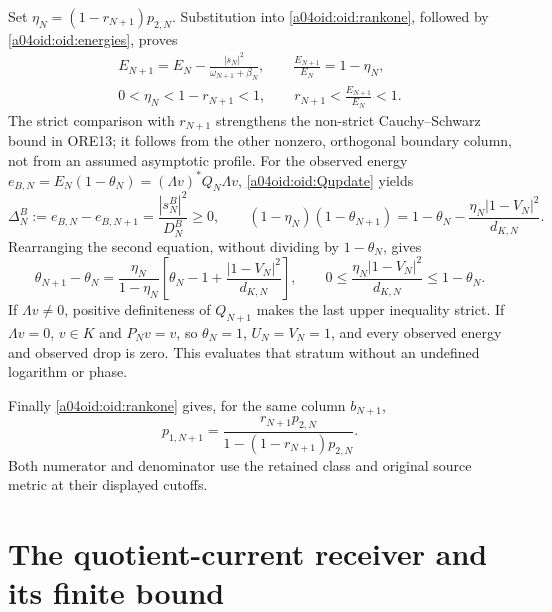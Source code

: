 Set $\eta_N=(1-r_{N+1})p_{2,N}$. Substitution into
\eqref{a04oid:oid:rankone}, followed by \eqref{a04oid:oid:energies}, proves
\begin{equation}\label{a04oid:oid:Eloss}
\begin{gathered}
 E_{N+1}=E_N-\frac{|s_N|^2}{\omega_{N+1}+\beta_N},\qquad
 \frac{E_{N+1}}{E_N}=1-\eta_N,\\
 0<\eta_N<1-r_{N+1}<1,
 \qquad r_{N+1}<\frac{E_{N+1}}{E_N}<1.
\end{gathered}
\end{equation}
The strict comparison with $r_{N+1}$ strengthens the non-strict
Cauchy--Schwarz bound in ORE13; it follows from the other nonzero,
orthogonal boundary column, not from an assumed asymptotic profile.
For the observed energy
$e_{B,N}=E_N(1-\theta_N)=(\Lambda v)^*Q_N\Lambda v$,
\eqref{a04oid:oid:Qupdate} yields
\begin{equation}\label{a04oid:oid:observedloss}
 \Delta_N^B:=e_{B,N}-e_{B,N+1}
 =\frac{|s_N^B|^2}{D_N^B}\ge0,
 \qquad
 (1-\eta_N)(1-\theta_{N+1})
 =1-\theta_N-\frac{\eta_N|1-V_N|^2}{d_{K,N}}.
\end{equation}
Rearranging the second equation, without dividing by $1-\theta_N$,
gives
\begin{equation}\label{a04oid:oid:theta}
 \theta_{N+1}-\theta_N
 =\frac{\eta_N}{1-\eta_N}
 \left[\theta_N-1+\frac{|1-V_N|^2}{d_{K,N}}\right],\qquad
 0\le\frac{\eta_N|1-V_N|^2}{d_{K,N}}\le1-\theta_N.
\end{equation}
If $\Lambda v\ne0$, positive definiteness of $Q_{N+1}$ makes the
last upper inequality strict. If $\Lambda v=0$, $v\in K$ and
$P_Nv=v$, so $\theta_N=1$, $U_N=V_N=1$, and every observed
energy and observed drop is zero. This evaluates that stratum without
an undefined logarithm or phase.

Finally \eqref{a04oid:oid:rankone} gives, for the same column $b_{N+1}$,
\begin{equation}\label{a04oid:oid:p1transport}
 p_{1,N+1}=
 \frac{r_{N+1}p_{2,N}}
 {1-(1-r_{N+1})p_{2,N}}.
\end{equation}
Both numerator and denominator use the retained class and original
source metric at their displayed cutoffs.

\section{The quotient-current receiver and its finite bound}

